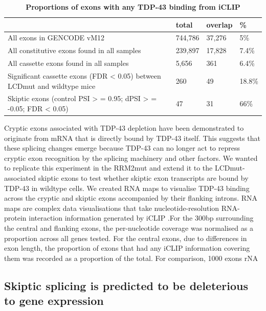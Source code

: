 \begin{table}
	\begin{footnotesize}
	\begin{tabular}{llll}
		& total &	overlap	& \% \\
		\hline
		All exons in GENCODE vM12 &	744,786	& 37,276 & 5\% \\
		All constitutive exons found in all samples	& 239,897	& 17,828	& 7.4\% \\
		All cassette exons found in all samples &	5,656 &	361	& 6.4\% \\
		Significant cassette exons (FDR < 0.05) between LCDmut and wildtype mice	& 260	& 49 & 18.8\% \\
		Skiptic exons (control PSI > = 0.95; dPSI > = -0.05; FDR < 0.05) & 47 &	31 & 66\% \\
	\end{tabular}
	\end{footnotesize}
	\caption{\textbf{Proportions of exons with any TDP-43 binding from iCLIP}}
	\label{tab:iclip_proportions}
\end{table}

Cryptic exons associated with TDP-43 depletion have been demonstrated to originate from mRNA that is directly bound by TDP-43 itself. This suggests that these splicing changes emerge because TDP-43 can no longer act to repress cryptic exon recognition by the splicing machinery and other factors. We wanted to replicate this experiment in the RRM2mut and extend it to the LCDmut-associated skiptic exons to test whether skiptic exon transcripts are bound by TDP-43 in wildtype cells. We created RNA maps to visualise TDP-43 binding across the cryptic and skiptic exons accompanied by their flanking introns. RNA maps are complex data visualisations that take nucleotide-resolution RNA-protein interaction information generated by iCLIP \citep{Huppertz2014-ip}.For the 300bp surrounding the central and flanking exons, the per-nucleotide coverage was normalised as a proportion across all genes tested. For the central exons, due to differences in exon length, the proportion of exons that had any iCLIP information covering them was recorded as a proportion of the total. For comparison, 1000 exons rNA %

\subsection{Skiptic splicing is predicted to be deleterious to gene expression}

